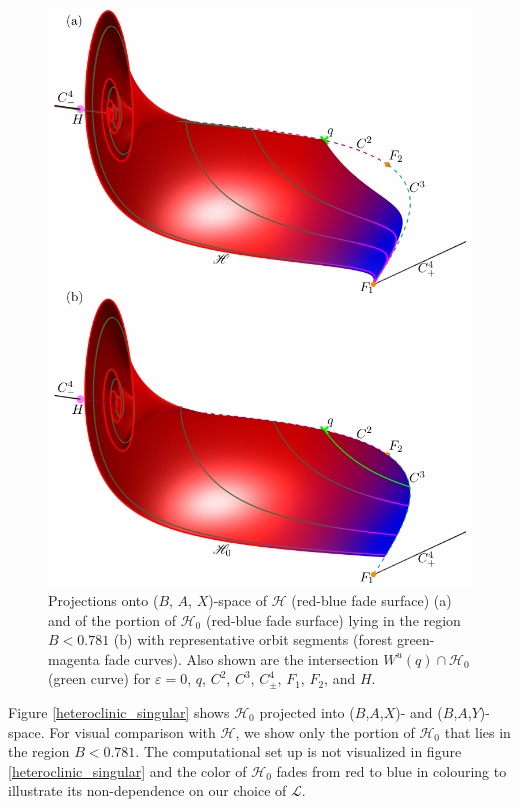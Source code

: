\documentclass{ws-ijbc}
\begin{document}
\begin{figure}[H]
\centering
\includegraphics[]{./figures/MKMO_11.pdf}
\caption{Projections onto ($B$, $A$, $X$)-space of $\mathscr{H}$ (red-blue fade surface) (a) and of the portion of $\mathscr{H}_0$ (red-blue fade surface) lying in the region $B < 0.781$ (b) with representative orbit segments (forest green-magenta fade curves).  Also shown are the intersection $W^u(q)\cap\mathscr{H}_0$ (green curve) for $\varepsilon=0$, $q$, $C^2$, $C^3$, $C^4_\pm$, $F_1$, $F_2$, and $H$.}
\label{figure_11}
\end{figure}

Figure \ref{heteroclinic_singular} shows $\mathscr{H}_0$ projected into ($B$,$A$,$X$)- and ($B$,$A$,$Y$)-space.  For visual comparison with $\mathscr{H}$, we show only the portion of $\mathscr{H}_0$ that lies in the region $B < 0.781$.  The computational set up is not visualized in figure \ref{heteroclinic_singular} and the color of $\mathscr{H}_0$ fades from red to blue in colouring to illustrate its non-dependence on our choice of $\mathscr{L}$.
\end{document}
